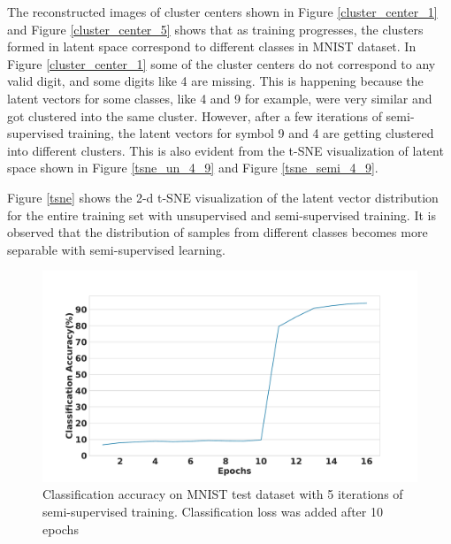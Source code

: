 \documentclass[runningheads]{llncs}
\begin{document}
The reconstructed images of cluster centers shown in Figure \ref{cluster_center_1} and Figure \ref{cluster_center_5} shows that as training progresses, the clusters formed in latent space correspond to different classes in MNIST dataset.
In Figure \ref{cluster_center_1} some of the cluster centers do not correspond to any valid digit, and some digits like 4  are missing.
This is happening because the latent vectors for some classes, like  4 and 9 for example,  were very similar and got clustered into the same cluster.
However, after a few iterations of semi-supervised training, the latent vectors for symbol 9 and 4 are getting clustered into different clusters.
This is also evident from the t-SNE visualization of latent space shown in Figure \ref{tsne_un_4_9} and Figure \ref{tsne_semi_4_9}.

Figure \ref{tsne} shows the 2-d t-SNE visualization of the latent vector distribution for the entire training set with unsupervised and semi-supervised training.
It is observed that the distribution of samples from different classes becomes more separable with semi-supervised learning.

\begin{figure}[!t]
\centering
  \centering
  \includegraphics[width=.5\linewidth]{classification_acc_semi_supervised}
\caption{Classification accuracy on MNIST test dataset with 5 iterations of semi-supervised training. Classification loss was added after 10 epochs}
\label{classificaion_acc}
\end{figure}


\end{document}
